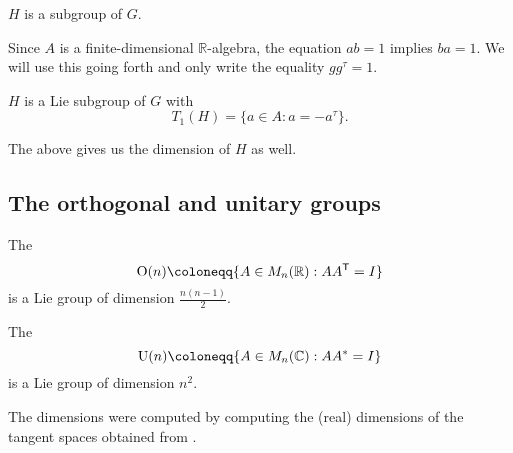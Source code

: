 \documentclass[12pt]{article}
\begin{document}
\begin{lem}
	$H$ is a subgroup of $G$.
\end{lem}

\begin{rem}
	Since $A$ is a finite-dimensional $\mathbb{R}$-algebra, the equation $ab = 1$ implies $ba = 1$. 
	We will use this going forth and only write the equality $gg^{\tau} = 1$.
\end{rem}

\begin{thm} \label{thm:involution-subgroup-tangent-space}
	$H$ is a Lie subgroup of $G$ with
	\begin{equation*} 
		T_{1}(H) = \{a \in A : a = -a^{\tau}\}.
	\end{equation*}
\end{thm}
The above gives us the dimension of $H$ as well.

\subsection{The orthogonal and unitary groups}

\begin{ex} \label{ex:orthogonal-unitary-groups-dimensions}
	The 
	\begin{equation*} 
		\OO(n) \coloneqq \{A \in M_{n}(\mathbb{R}) : A A^{\trans} = I\}
	\end{equation*}
	is a Lie group of dimension $\frac{n(n - 1)}{2}$.

	The 
	\begin{equation*} 
		\UU(n) \coloneqq \{A \in M_{n}(\mathbb{C}) : A A^{\ast} = I\}
	\end{equation*}
	is a Lie group of dimension $n^{2}$.

	The dimensions were computed by computing the (real) dimensions of the tangent spaces obtained from .
\end{ex}
\end{document}
